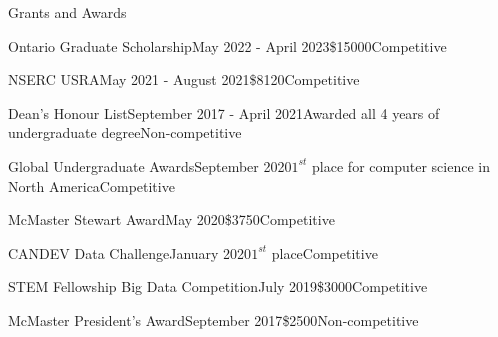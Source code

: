 \begin{rSection}{Grants and Awards} 

\begin{aSubsection}{Ontario Graduate Scholarship}{May 2022 - April 2023}{\$15000}{Competitive}
\end{aSubsection}

\begin{aSubsection}{NSERC USRA}{May 2021 - August 2021}{\$8120}{Competitive}
\end{aSubsection}

\begin{aSubsection}{Dean's Honour List}{September 2017 - April 2021}{Awarded all 4 years of undergraduate degree}{Non-competitive}
\end{aSubsection}

\begin{aSubsection}{Global Undergraduate Awards}{September 2020}{$1^{st}$ place for computer science in North America}{Competitive}
\end{aSubsection}

\begin{aSubsection}{McMaster Stewart Award}{May 2020}{\$3750}{Competitive}
\end{aSubsection}

\begin{aSubsection}{CANDEV Data Challenge}{January 2020}{$1^{st}$ place}{Competitive}
\end{aSubsection}

\begin{aSubsection}{STEM Fellowship Big Data Competition}{July 2019}{\$3000}{Competitive}
\end{aSubsection}

\begin{aSubsection}{McMaster President's Award}{September 2017}{\$2500}{Non-competitive}
\end{aSubsection}

\end{rSection}

